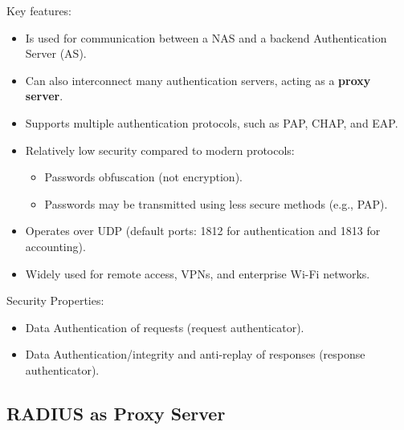 Key features:
\begin{itemize}
    \item Is used for communication between a NAS and a backend Authentication Server (AS).
    \item Can also interconnect many authentication servers, acting as a \textbf{proxy server}.  
    \item Supports multiple authentication protocols, such as PAP, CHAP, and EAP.
    \item Relatively low security compared to modern protocols:
    \begin{itemize}
        \item Passwords obfuscation (not encryption).
        \item Passwords may be transmitted using less secure methods (e.g., PAP).
    \end{itemize}
    \item Operates over UDP (default ports: 1812 for authentication and 1813 for accounting).
    \item Widely used for remote access, VPNs, and enterprise Wi-Fi networks.
\end{itemize}

Security Properties:
\begin{itemize}
    \item Data Authentication of requests (request authenticator).
    \item Data Authentication/integrity and anti-replay of responses (response authenticator).
\end{itemize}


\subsection{RADIUS as Proxy Server}

